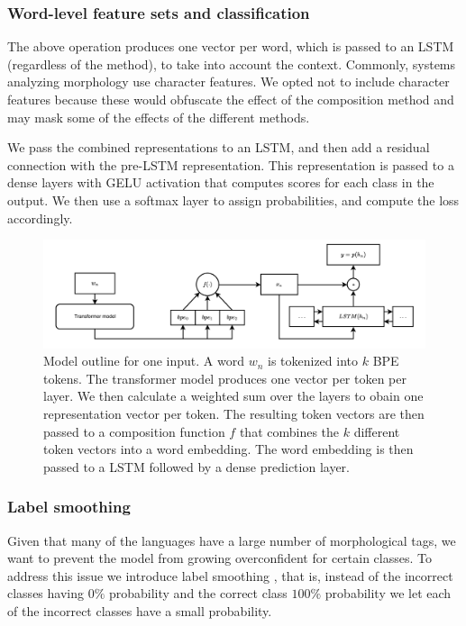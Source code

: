 \documentclass[11pt]{article}
\begin{document}
     \subsubsection{Word-level feature sets and classification}
     The above operation produces one vector per word, which is passed
     to an LSTM (regardless of the method), to take into account the
     context.
    Commonly, systems analyzing morphology use character features. We
     opted not to include character features because these would
     obfuscate the effect of the composition method and may mask some
     of the effects of the different methods.

    We pass the combined representations to an LSTM, and then add a
     residual connection with the pre-LSTM representation.  This
     representation is passed to a dense layers with GELU activation
     that computes scores for each class in the output. We then use a
     softmax layer to assign probabilities, and compute the loss
     accordingly.

	\begin{figure}%
          \centering
	\includegraphics[scale=0.5]{single-step-final.pdf}
        \caption{\label{fig:model} Model outline for one input. A word
     $w_n$ is tokenized into $k$ BPE tokens. The transformer model produces one vector per token per layer.
     We then calculate a weighted sum over the layers to obain one representation vector per token.
     The resulting token vectors are then passed to a
     composition function $f$ that combines the $k$ different
     token vectors into a word embedding. The word embedding is then
     passed to a LSTM followed by a dense prediction layer. }
	\end{figure}

	\subsubsection{Label smoothing}
    	Given that many of the languages have a large number of
     morphological tags, we want to prevent the model from growing
     overconfident for certain classes. To address this issue we
     introduce label smoothing \cite{szegedy2016rethinking}, that is,
     instead of the incorrect classes having $0\%$ probability and the
     correct class $100\%$ probability we let each of the incorrect
     classes have a small probability.
\end{document}
